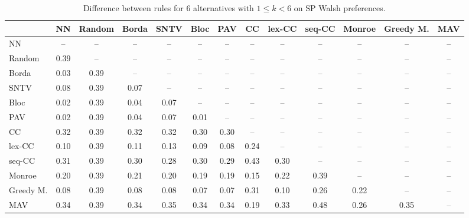 
\begin{table*}[htbp]
\centering
\begin{tabular}{lcccccccccccc}
\toprule
 & NN & Random & Borda & SNTV & Bloc & PAV & CC & lex-CC & seq-CC & Monroe & Greedy M. & MAV \\
\midrule
NN & -- & -- & -- & -- & -- & -- & -- & -- & -- & -- & -- & -- \\
Random & \cellcolor{blue!39} 0.39 & -- & -- & -- & -- & -- & -- & -- & -- & -- & -- & -- \\
Borda & \cellcolor{blue!3} 0.03 & \cellcolor{blue!39} 0.39 & -- & -- & -- & -- & -- & -- & -- & -- & -- & -- \\
SNTV & \cellcolor{blue!8} 0.08 & \cellcolor{blue!39} 0.39 & \cellcolor{blue!7} 0.07 & -- & -- & -- & -- & -- & -- & -- & -- & -- \\
Bloc & \cellcolor{blue!2} 0.02 & \cellcolor{blue!39} 0.39 & \cellcolor{blue!4} 0.04 & \cellcolor{blue!7} 0.07 & -- & -- & -- & -- & -- & -- & -- & -- \\
PAV & \cellcolor{blue!2} 0.02 & \cellcolor{blue!39} 0.39 & \cellcolor{blue!4} 0.04 & \cellcolor{blue!7} 0.07 & \cellcolor{blue!1} 0.01 & -- & -- & -- & -- & -- & -- & -- \\
CC & \cellcolor{blue!32} 0.32 & \cellcolor{blue!39} 0.39 & \cellcolor{blue!32} 0.32 & \cellcolor{blue!32} 0.32 & \cellcolor{blue!30} 0.30 & \cellcolor{blue!30} 0.30 & -- & -- & -- & -- & -- & -- \\
lex-CC & \cellcolor{blue!10} 0.10 & \cellcolor{blue!39} 0.39 & \cellcolor{blue!11} 0.11 & \cellcolor{blue!13} 0.13 & \cellcolor{blue!9} 0.09 & \cellcolor{blue!8} 0.08 & \cellcolor{blue!24} 0.24 & -- & -- & -- & -- & -- \\
seq-CC & \cellcolor{blue!31} 0.31 & \cellcolor{blue!39} 0.39 & \cellcolor{blue!30} 0.30 & \cellcolor{blue!28} 0.28 & \cellcolor{blue!30} 0.30 & \cellcolor{blue!28} 0.29 & \cellcolor{blue!43} 0.43 & \cellcolor{blue!30} 0.30 & -- & -- & -- & -- \\
Monroe & \cellcolor{blue!20} 0.20 & \cellcolor{blue!39} 0.39 & \cellcolor{blue!21} 0.21 & \cellcolor{blue!20} 0.20 & \cellcolor{blue!19} 0.19 & \cellcolor{blue!19} 0.19 & \cellcolor{blue!15} 0.15 & \cellcolor{blue!22} 0.22 & \cellcolor{blue!39} 0.39 & -- & -- & -- \\
Greedy M. & \cellcolor{blue!8} 0.08 & \cellcolor{blue!39} 0.39 & \cellcolor{blue!8} 0.08 & \cellcolor{blue!8} 0.08 & \cellcolor{blue!7} 0.07 & \cellcolor{blue!7} 0.07 & \cellcolor{blue!31} 0.31 & \cellcolor{blue!10} 0.10 & \cellcolor{blue!26} 0.26 & \cellcolor{blue!22} 0.22 & -- & -- \\
MAV & \cellcolor{blue!34} 0.34 & \cellcolor{blue!39} 0.39 & \cellcolor{blue!34} 0.34 & \cellcolor{blue!35} 0.35 & \cellcolor{blue!34} 0.34 & \cellcolor{blue!34} 0.34 & \cellcolor{blue!19} 0.19 & \cellcolor{blue!33} 0.33 & \cellcolor{blue!48} 0.48 & \cellcolor{blue!26} 0.26 & \cellcolor{blue!35} 0.35 & -- \\
\bottomrule
\end{tabular}

\caption{Difference between rules for 6 alternatives with $1 \leq k < 6$ on SP Walsh preferences.}
\label{tab:rule_distance_heatmap-m=[6]-pref_dist=single_peaked_walsh}
\end{table*}
    